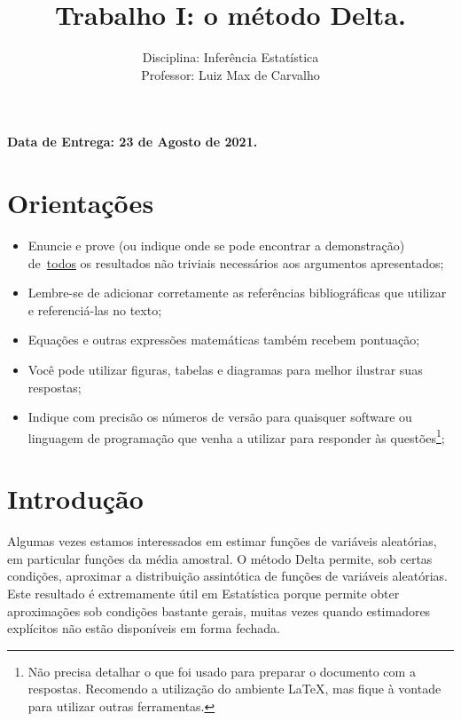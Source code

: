 \documentclass[a4paper,10pt, notitlepage]{report}
\title{Trabalho I: o método Delta.}
\author{Disciplina: Inferência Estatística \\ Professor: Luiz Max de Carvalho}
\begin{document}
\maketitle

\textbf{Data de Entrega: 23 de Agosto de 2021.}

\section*{Orientações}
\begin{itemize}
 \item Enuncie e prove (ou indique onde se pode encontrar a demonstração) de~\underline{todos} os resultados não triviais necessários aos argumentos apresentados;
 \item Lembre-se de adicionar corretamente as referências bibliográficas que utilizar e referenciá-las no texto;
 \item Equações e outras expressões matemáticas também recebem pontuação;
 \item Você pode utilizar figuras, tabelas e diagramas para melhor ilustrar suas respostas;
 \item Indique com precisão os números de versão para quaisquer software ou linguagem de programação que venha a utilizar para responder às questões\footnote{Não precisa detalhar o que foi usado para preparar o documento com a respostas. Recomendo a utilização do ambiente LaTeX, mas fique à vontade para utilizar outras ferramentas.};
 \end{itemize}


\section*{Introdução}

Algumas vezes estamos interessados em estimar funções de variáveis aleatórias, em particular funções da média amostral.
O método Delta permite, sob certas condições, aproximar a distribuição assintótica de funções de variáveis aleatórias.
Este resultado é extremamente útil em Estatística porque permite obter aproximações sob condições bastante gerais, muitas vezes quando estimadores explícitos não estão disponíveis em forma fechada.
\end{document}
